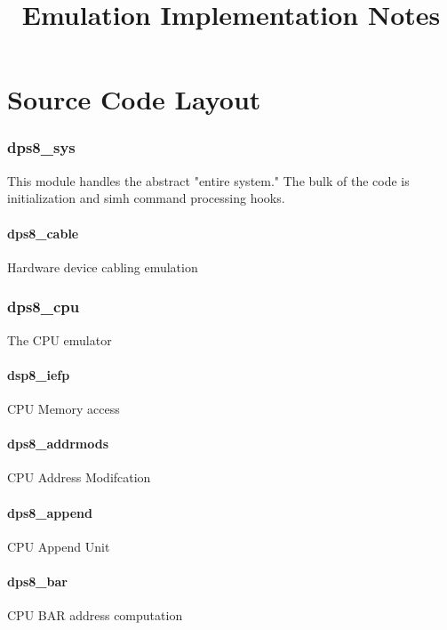 \documentclass[notitlepage]{report}
\begin{document}
\title{Emulation Implementation Notes}
\maketitle

\part{Source Code Layout}

\section{dps8\_sys} 

This module handles the abstract "entire system." The bulk of the code is 
initialization and simh command processing hooks.

\subsection{dps8\_cable}

Hardware device cabling emulation

\section{dps8\_cpu} 

The CPU emulator

\subsection{dsp8\_iefp}

CPU Memory access

\subsection{dps8\_addrmods}

CPU Address Modifcation

\subsection{dps8\_append}

CPU Append Unit

\subsection{dps8\_bar}

CPU BAR address computation
\end{document}

